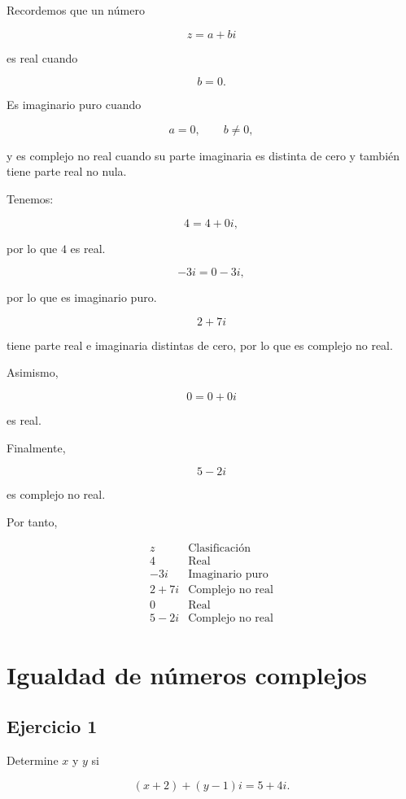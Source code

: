 \documentclass[12pt]{article}
\begin{document}
Recordemos que un número

\[
z=a+bi
\]

es real cuando

\[
b=0.
\]

Es imaginario puro cuando

\[
a=0,\qquad b\neq0,
\]

y es complejo no real cuando su parte imaginaria es distinta de cero y
también tiene parte real no nula.

Tenemos:

\[
4=4+0i,
\]

por lo que \(4\) es real.

\[
-3i=0-3i,
\]

por lo que es imaginario puro.

\[
2+7i
\]

tiene parte real e imaginaria distintas de cero, por lo que es complejo
no real.

Asimismo,

\[
0=0+0i
\]

es real.

Finalmente,

\[
5-2i
\]

es complejo no real.

Por tanto,

\[
\boxed{
\begin{array}{c|c}
z & \text{Clasificación}\\
\hline
4 & \text{Real}\\
-3i & \text{Imaginario puro}\\
2+7i & \text{Complejo no real}\\
0 & \text{Real}\\
5-2i & \text{Complejo no real}
\end{array}}
\]

\section*{Igualdad de números complejos}

\subsection*{Ejercicio 1}

Determine \(x\) y \(y\) si

\[
(x+2)+(y-1)i=5+4i.
\]
\end{document}
